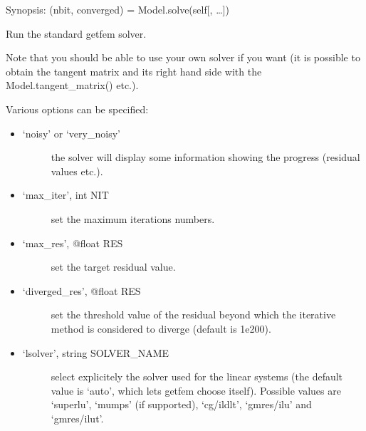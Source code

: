 \documentclass[a4paper,11pt,english]{sphinxmanual}
\begin{document}
\begin{fulllineitems}
\begin{fulllineitems}
\end{fulllineitems}


\begin{fulllineitems}
\label{\detokenize{python/cmdref_Model:getfem.Model.solve}}
Synopsis: (nbit, converged) = Model.solve(self{[}, …{]})

Run the standard getfem solver.

Note that you should be able to use your own solver if you want
(it is possible to obtain the tangent matrix and its right hand
side with the Model.tangent\_matrix() etc.).

Various options can be specified:
\begin{itemize}
\item {} \begin{description}
\item[{‘noisy’ or ‘very\_noisy’}] \leavevmode
the solver will display some information showing the progress
(residual values etc.).

\end{description}

\item {} \begin{description}
\item[{‘max\_iter’, int NIT}] \leavevmode
set the maximum iterations numbers.

\end{description}

\item {} \begin{description}
\item[{‘max\_res’, @float RES}] \leavevmode
set the target residual value.

\end{description}

\item {} \begin{description}
\item[{‘diverged\_res’, @float RES}] \leavevmode
set the threshold value of the residual beyond which the iterative
method is considered to diverge (default is 1e200).

\end{description}

\item {} \begin{description}
\item[{‘lsolver’, string SOLVER\_NAME}] \leavevmode
select explicitely the solver used for the linear systems (the
default value is ‘auto’, which lets getfem choose itself).
Possible values are ‘superlu’, ‘mumps’ (if supported),
‘cg/ildlt’, ‘gmres/ilu’ and ‘gmres/ilut’.


\end{description}
\end{itemize}
\end{fulllineitems}
\end{fulllineitems}
\end{document}
